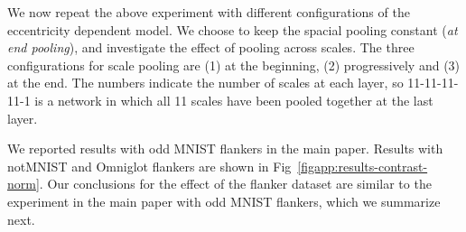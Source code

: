 \documentclass{article}
\begin{document}
We now repeat the above experiment with different configurations of the eccentricity dependent model. We choose to keep the spacial pooling constant (\emph{at end pooling}), and investigate the effect of pooling across scales.  The three configurations for scale pooling are  (1) at the beginning, (2) progressively and (3) at the end.  The numbers indicate the number of scales at each layer, so 11-11-11-11-1 is a network in which all 11 scales have been pooled together at the last layer.

We reported results with odd MNIST flankers in the main paper. Results with notMNIST and Omniglot flankers are shown in Fig~\ref{figapp:results-contrast-norm}.  Our conclusions for the effect of the flanker dataset are similar to the experiment in the main paper with odd MNIST flankers, which we summarize next.  
\end{document}
